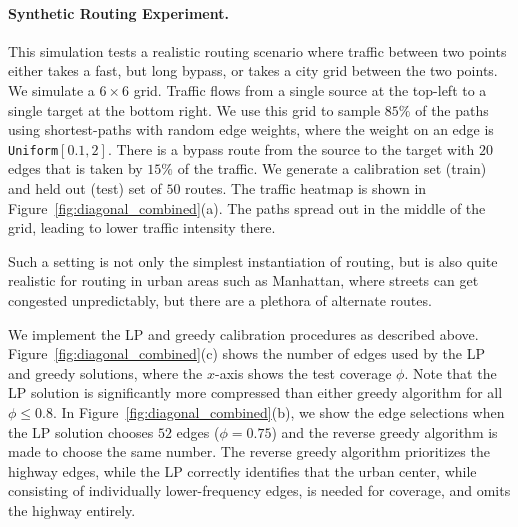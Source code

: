 \paragraph{Synthetic Routing Experiment.}
This simulation tests a realistic routing scenario where traffic between two points either takes a fast, but long bypass, or takes a city grid between the two points. %
We simulate a $6 \times 6$ grid. Traffic flows from a single source at the top-left to a single target at the bottom right.  We use this grid to sample $85\%$ of the paths using shortest-paths with random edge weights, where the weight on an edge is {\tt Uniform}$[0.1,2]$. There is a bypass route from the source to the target with $20$ edges that is taken by $15\%$ of the traffic. We generate a calibration set (train) and held out (test) set of $50$ routes.   The traffic heatmap is shown in Figure~\ref{fig:diagonal_combined}(a). The paths spread out in the middle of the grid, leading to lower traffic intensity there.   

Such a setting is not only the simplest instantiation of routing, but is also quite realistic for routing in urban areas such as Manhattan, where streets can get congested unpredictably, but there are a plethora of alternate routes. 

We implement the LP and greedy calibration procedures as described above. Figure~\ref{fig:diagonal_combined}(c) shows the number of edges used by the LP and greedy solutions, where the $x$-axis shows the test coverage $\phi$.  Note that the LP solution is significantly more compressed than either greedy algorithm for all $\phi \le 0.8$.  In Figure~\ref{fig:diagonal_combined}(b), we show the edge selections when the LP solution chooses $52$ edges ($\phi = 0.75$) and the reverse greedy algorithm is made to choose the same number. The reverse greedy algorithm prioritizes the highway edges, while the LP correctly identifies that the urban center, while consisting of individually lower-frequency edges, is needed for coverage, and omits the highway entirely.



